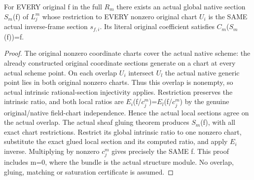 \begin{theorem}
\label{thm:seven-native-original-tensor-gluing}
\leanok
For EVERY original f in the full $R_m$ there exists an actual global native
section $S_m$(f) of $L_j^m$ whose restriction to EVERY nonzero original chart
$U_i$ is the SAME actual inverse-frame section $s_{f,i}$. Its literal original
coefficient satisfies $C_m$($S_m$(f))=f.
\end{theorem}
\begin{proof}
The original nonzero coordinate charts cover the actual native scheme:
the already constructed original coordinate sections generate on a chart
at every actual scheme point. On each overlap $U_i$ intersect $U_l$ the actual
native generic point lies in both original nonzero charts. Thus this
overlap is nonempty, so actual intrinsic rational-section injectivity
applies. Restriction preserves the intrinsic ratio, and both local ratios
are $E_i$(f/$c_j^m$)=$E_l$(f/$c_j^m$) by the genuine original/native field-chart
independence. Hence the actual local sections agree on the actual overlap.
The actual sheaf gluing theorem produces $S_m$(f), with all exact chart
restrictions. Restrict its global intrinsic ratio to one nonzero chart,
substitute the exact glued local section and its computed ratio, and apply
$E_i$ inverse. Multiplying by nonzero $c_j^m$ gives precisely the SAME f.
This proof includes m=0, where the bundle is the actual structure module.
No overlap, gluing, matching or saturation certificate is assumed.
\end{proof}

